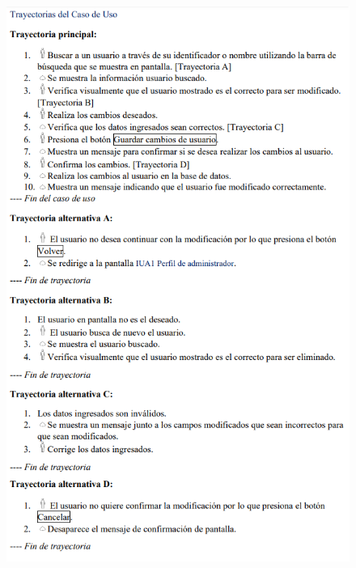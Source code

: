 \documentclass[12pt,letterpaper]{article}
\begin{document}
            \begin{figure}[H]
                \centering
                \includegraphics [scale=0.75]{specs/trayModificarInformacion}
            \end{figure}
\end{document}
